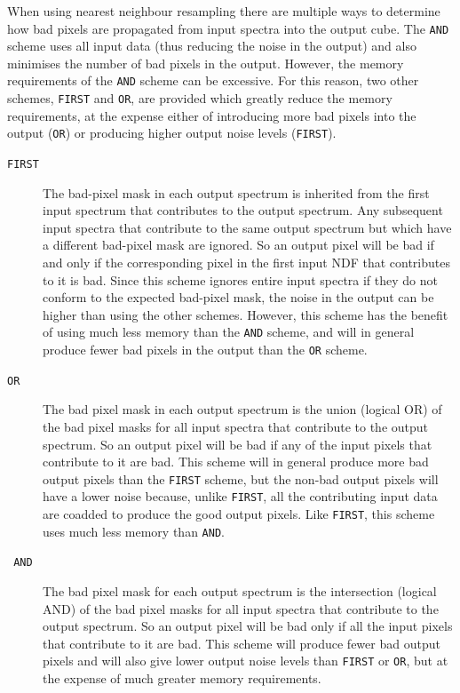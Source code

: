 \documentclass[final,authoryear,5p,times,twocolumn]{elsarticle}
\begin{document}
When using nearest neighbour resampling there are multiple ways to
determine how bad pixels are propagated from input spectra into the
output cube. The \texttt{AND} scheme uses all input data (thus
reducing the noise in the output) and also minimises the number of bad
pixels in the output. However, the memory requirements of the
\texttt{AND} scheme can be excessive. For this reason, two other
schemes, \texttt{FIRST} and \texttt{OR}, are provided which greatly
reduce the memory requirements, at the expense either of introducing
more bad pixels into the output (\texttt{OR}) or producing higher
output noise levels (\texttt{FIRST}).

\begin{description}
\item[\texttt{FIRST}] The bad-pixel mask in each output spectrum is
  inherited from the first input spectrum that contributes to the
  output spectrum. Any subsequent input spectra that contribute to the
  same output spectrum but which have a different bad-pixel mask are
  ignored. So an output pixel will be bad if and only if the
  corresponding pixel in the first input NDF that contributes to it is
  bad. Since this scheme ignores entire input spectra if they do not
  conform to the expected bad-pixel mask, the noise in the output can
  be higher than using the other schemes. However, this scheme has the
  benefit of using much less memory than the \texttt{AND} scheme, and
  will in general produce fewer bad pixels in the output than the
  \texttt{OR} scheme.

\item[\texttt{OR}] The bad pixel mask in each output spectrum is the
  union (logical OR) of the bad pixel masks for all input spectra that
  contribute to the output spectrum. So an output pixel will be bad if
  any of the input pixels that contribute to it are bad.  This scheme
  will in general produce more bad output pixels than the
  \texttt{FIRST} scheme, but the non-bad output pixels will have a
  lower noise because, unlike \texttt{FIRST}, all the contributing
  input data are coadded to produce the good output pixels. Like
  \texttt{FIRST}, this scheme uses much less memory than \texttt{AND}.

\item[\texttt{ AND}] The bad pixel mask for each output spectrum is
  the intersection (logical AND) of the bad pixel masks for all input
  spectra that contribute to the output spectrum. So an output pixel
  will be bad only if all the input pixels that contribute to it are
  bad. This scheme will produce fewer bad output pixels and will also
  give lower output noise levels than \texttt{FIRST} or \texttt{OR},
  but at the expense of much greater memory requirements.

\end{description}
\end{document}
